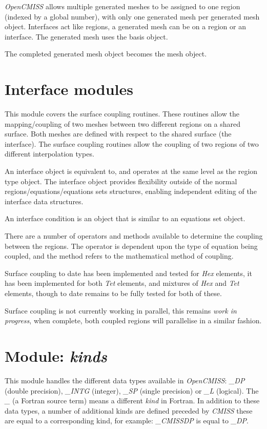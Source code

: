 \emph{OpenCMISS} allows multiple generated meshes to be assigned to one region 
(indexed by a global number), with only one generated mesh per generated mesh 
object. Interfaces act like regions, a generated mesh can be on a region or an
interface. The generated mesh uses the basis object.

The completed generated mesh object becomes the mesh object.


\section{Interface modules}
\label{sec:interfacemodules}

This module covers the surface coupling routines. These routines allow the 
mapping/coupling of two meshes between two different regions on a shared
surface. Both meshes are defined with respect to the shared surface (the 
interface). The surface coupling routines allow the coupling of two regions 
of two different interpolation types. 

An interface object is equivalent to, and operates at the same level as 
the region type object. The interface object provides flexibility outside 
of the normal regions/equations/equations sets structures, enabling 
independent editing of the interface data structures.

An interface condition is an object that is similar to an equations set 
object. 

There are a number of operators and methods available to determine the 
coupling between the regions. The operator is dependent upon the type of 
equation being coupled, and the method refers to the mathematical method of 
coupling.

Surface coupling to date has been implemented and tested for \emph{Hex} 
elements, it has been implemented for both \emph{Tet} elements, and mixtures 
of \emph{Hex} and \emph{Tet} elements, though to date remains to be fully 
tested for both of these.

Surface coupling is not currently working in parallel, this remains 
\emph{work in progress}, when complete, both coupled regions will parallelise 
in a similar fashion.


\section{Module: \emph{kinds}}
\label{sec:kinds}

This module handles the different data types available in \emph{OpenCMISS}: 
\emph{\_DP} (double precision), \emph{\_INTG} (integer), \emph{\_SP} (single 
precision) or \emph{\_L} (logical). The \emph{\_} (a Fortran source term) 
means a different \emph{kind} in Fortran. In addition to these data types, 
a number of additional kinds are defined preceded by \emph{CMISS} these 
are equal to a corresponding kind, for example: \emph{\_CMISSDP} is 
equal to \emph{\_DP}. 


